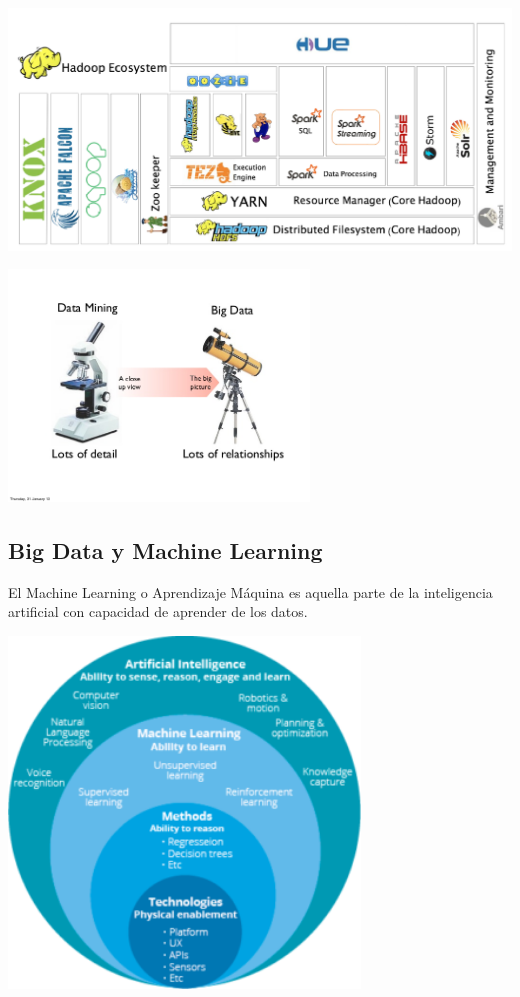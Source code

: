\documentclass[
]{book}
\begin{document}
\includegraphics{images/T3-ecosistema.png}

\includegraphics[width=0.6\textwidth,height=\textheight]{images/T3-DMvsBD.jpg}

\hypertarget{big-data-y-machine-learning}{%
\subsection{Big Data y Machine Learning}\label{big-data-y-machine-learning}}

El Machine Learning o Aprendizaje Máquina es aquella parte de la inteligencia artificial con capacidad de aprender de los datos.

\includegraphics[width=0.7\textwidth,height=\textheight]{images/T3-AI-ML.png}
\end{document}
